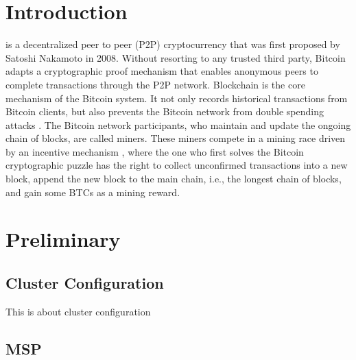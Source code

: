 \documentclass[10pt,journal,compsoc, twoside]{IEEEtran}
\begin{document}
\maketitle
\IEEEdisplaynontitleabstractindextext
\IEEEpeerreviewmaketitle


\ifCLASSOPTIONcompsoc
{}
\else
\section{Introduction}
\label{sec:introduction}
\fi



 \cite{nakamoto2008bitcoin} is a decentralized peer to peer (P2P) cryptocurrency that was first proposed by Satoshi Nakamoto in 2008. Without resorting to any trusted third party, Bitcoin adapts a cryptographic proof mechanism that enables anonymous peers to complete transactions through the P2P network. Blockchain is the core mechanism of the Bitcoin system. It not only records historical transactions from Bitcoin clients, but also prevents the Bitcoin network from double spending attacks \cite{karame2015misbehavior}. The Bitcoin network participants, who maintain and update the ongoing chain of blocks, are called miners. These miners compete in a mining race driven by an incentive mechanism \cite{lewenberg2015bitcoin, schrijvers2016incentive}, where the one who first solves the Bitcoin cryptographic puzzle \cite{giechaskiel2016bitcoin} has the right to collect unconfirmed transactions into a new block, append the new block to the main chain, i.e., the longest chain of blocks, and gain some BTCs \cite{BTC} as a mining reward.



\section{Preliminary}

\subsection{Cluster Configuration}

This is about cluster configuration



\subsection{MSP}
\end{document}
